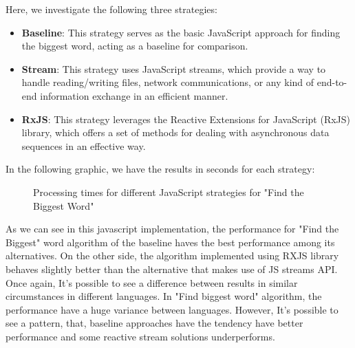 Here, we investigate the following three strategies:
\begin{itemize}
    \item \textbf{Baseline}: This strategy serves as the basic JavaScript approach for finding the biggest word, acting as a baseline for comparison.
    \item \textbf{Stream}: This strategy uses JavaScript streams, which provide a way to handle reading/writing files, network communications, or any kind of end-to-end information exchange in an efficient manner.
    \item \textbf{RxJS}: This strategy leverages the Reactive Extensions for JavaScript (RxJS) library, which offers a set of methods for dealing with asynchronous data sequences in an effective way.
\end{itemize}

In the following graphic, we have the results in seconds for each strategy:
\begin{figure}[H]
    \centering
    \caption{Processing times for different JavaScript strategies for "Find the Biggest Word"}
    \label{fig:biggest_word_processing_times_js}
\end{figure}

As we can see in this javascript implementation, the performance for "Find the Biggest" word algorithm of the baseline haves the best performance among its alternatives. On the other side, the algorithm implemented using RXJS library behaves slightly better than the alternative that makes use of JS streams API.
Once again, It's possible to see a difference between results in similar circumstances in different languages. In "Find biggest word" algorithm, the performance have a huge variance between languages. However, It's possible to see a pattern, that, baseline approaches have the tendency have better performance and some reactive stream solutions underperforms.
